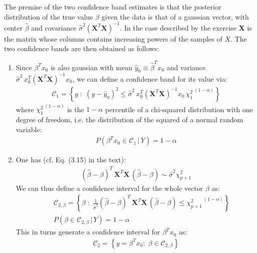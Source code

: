 

\seecode

The premise of the two confidence band estimates is that the posterior
distribution of the true value $\beta$ given the data is that of a gaussian vector, 
with center $\hat{\beta}$ and covariance $ \hat{\sigma}^2 \left( \mathbf{X} ^T \mathbf{X}  \right) ^{-1}$. In the case described by the exercise $\mathbf{X}$
is the matrix whose columns contains increasing powers of the samples of $X$.
The two confidence bands are then obtained as follows:
\begin{enumerate}
    \item Since $\beta^T x_0$ is also gaussian with mean $\hat{y}_0 \equiv \hat{\beta}^T x_0$ and variance $\hat{\sigma}^2\, x_0^T ( \mathbf{X} ^T \mathbf{X})^{-1} x_0$, we can define a confidence band for its value via:
    \begin{eqnarray*}
        \mathcal{C}_1 =  \left\{ y \; : \; (y - \hat{y}_0)^2 \leq \hat{\sigma}^2 \, x_0^T ( \mathbf{X} ^T \mathbf{X})^{-1} x_0 \, {\chi_{1}^2} ^{\,(1- \alpha)} \right\}
    \end{eqnarray*}
    where ${\chi_{1}^2} ^{\,(1- \alpha)}$ is the $1 - \alpha$ percentile of a chi-squared distribution with one degree of freedom, i.e. the distribution of the squared of a normal random variable:
    \begin{eqnarray*}
        P(\beta^T x_0 \in \mathcal{C}_1 \, | \, Y) = 1 - \alpha
    \end{eqnarray*}
    \item One has (cf. Eq. (3.15) in the text):
    \begin{eqnarray*}
        ( \hat{\beta} - \beta) ^T \, \mathbf{X}^T \mathbf{X} \, ( \hat{\beta} - \beta) \sim \hat{\sigma}^2 \chi_{p+1}^2
    \end{eqnarray*}
    We can thus define a confidence interval for the whole vector $\beta$ as:
    \begin{eqnarray*}
        && \mathcal{C}_{2, \beta}  = \left\{ \beta \; : \;\frac{1}{\hat{\sigma}^2} ( \hat{\beta} - \beta) ^T \, \mathbf{X}^T \mathbf{X} \, ( \hat{\beta} - \beta) \leq  {\chi_{p + 1}^2} ^{\,(1- \alpha)} \right\} \\
        && P(\beta \in \mathcal{C}_{2, \beta} \, | \, Y)  =  1 - \alpha
    \end{eqnarray*}
    This in turns generate a confidence interval for $\beta^T x_0$ as:
    \begin{eqnarray*}
        \mathcal{C}_2 = \left\{ y = \beta^T x_0: \; \beta \in \mathcal{C}_{2, \beta} \right\}
    \end{eqnarray*}
\end{enumerate}
